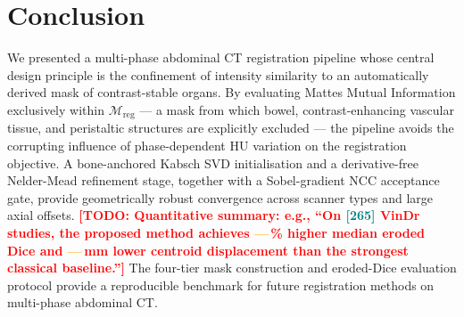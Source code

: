 \documentclass[10pt,twocolumn]{article}
\newcommand{\TODO}[1]{\textcolor{red}{\textbf{[TODO: #1]}}}
\newcommand{\NUM}[1]{\textcolor{teal}{[#1]}}
\newcommand{\BLANK}{\textcolor{orange}{\textbf{---}}}   %
\newcommand{\Mreg}{\mathcal{M}_{\text{reg}}}
\begin{document}
\section{Conclusion}
\label{sec:conclusion}

We presented a multi-phase abdominal CT registration pipeline whose
central design principle is the confinement of intensity similarity
to an automatically derived mask of contrast-stable organs.
By evaluating Mattes Mutual Information exclusively within $\Mreg$
— a mask from which bowel, contrast-enhancing vascular tissue, and
peristaltic structures are explicitly excluded — the pipeline avoids
the corrupting influence of phase-dependent HU variation on the
registration objective.
A bone-anchored Kabsch SVD initialisation and a derivative-free
Nelder-Mead refinement stage, together with a Sobel-gradient NCC
acceptance gate, provide geometrically robust convergence across
scanner types and large axial offsets.
\TODO{Quantitative summary: e.g., ``On \NUM{265} VinDr studies, the
proposed method achieves \BLANK\,\% higher median eroded Dice and
\BLANK\,mm lower centroid displacement than the strongest classical
baseline.''}
The four-tier mask construction and eroded-Dice evaluation protocol
provide a reproducible benchmark for future registration methods on
multi-phase abdominal CT.


\end{document}
